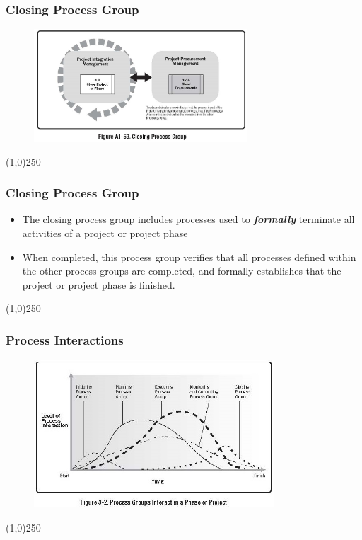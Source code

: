\begin{frame}
\frametitle{Closing Process Group}
 \begin{figure}
 	\centering
 		\includegraphics[width = 8cm]{images/FigA1-53.jpg}
 	\label{fig:A1-53}
 \end{figure}
\end{frame}
\begin{center}\line(1,0){250}\end{center}



\begin{frame}
\frametitle{Closing Process Group}
\begin{itemize}
	\item The closing process group includes processes used to \textbf{\textit{formally}} terminate all activities of a project or project phase
	\item When completed, this process group verifies that all processes defined within the other process groups are completed, and formally establishes that the project or project phase is finished.
\end{itemize}
\end{frame}
\begin{center}\line(1,0){250}\end{center}



\begin{frame}
\frametitle{Process Interactions}
 \begin{figure}
 	\centering
 		\includegraphics[width = 9cm]{images/Fig3-2.jpg}
 	\label{fig:3-2}
 \end{figure}
\end{frame}
\begin{center}\line(1,0){250}\end{center}



